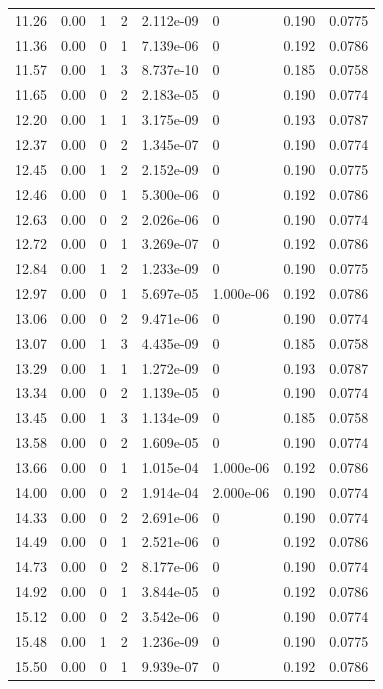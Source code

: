 \documentclass[preview]{standalone}
\begin{document}
{{{\begin{tabular}{L{1.2cm}C{1.2cm} C{0.3cm}C{0.5cm} C{1.4cm}C{1.4cm} C{1.4cm}C{1.4cm}}
  11.26  &  0.00  & 1     &  2 &  2.112e-09  & 0  & 0.190 &  0.0775   \\ 
  11.36  &  0.00  & 0     &  1 &  7.139e-06  & 0  & 0.192 &  0.0786   \\ 
  11.57  &  0.00  & 1     &  3 &  8.737e-10  & 0  & 0.185 &  0.0758   \\ 
  11.65  &  0.00  & 0     &  2 &  2.183e-05  & 0  & 0.190 &  0.0774   \\ 
  12.20  &  0.00  & 1     &  1 &  3.175e-09  & 0  & 0.193 &  0.0787   \\ 
  12.37  &  0.00  & 0     &  2 &  1.345e-07  & 0  & 0.190 &  0.0774   \\ 
  12.45  &  0.00  & 1     &  2 &  2.152e-09  & 0  & 0.190 &  0.0775   \\ 
  12.46  &  0.00  & 0     &  1 &  5.300e-06  & 0  & 0.192 &  0.0786   \\ 
  12.63  &  0.00  & 0     &  2 &  2.026e-06  & 0  & 0.190 &  0.0774   \\ 
  12.72  &  0.00  & 0     &  1 &  3.269e-07  & 0  & 0.192 &  0.0786   \\ 
  12.84  &  0.00  & 1     &  2 &  1.233e-09  & 0  & 0.190 &  0.0775   \\ 
  12.97  &  0.00  & 0     &  1 &  5.697e-05  & 1.000e-06  & 0.192 &  0.0786   \\ 
  13.06  &  0.00  & 0     &  2 &  9.471e-06  & 0  & 0.190 &  0.0774   \\ 
  13.07  &  0.00  & 1     &  3 &  4.435e-09  & 0  & 0.185 &  0.0758   \\ 
  13.29  &  0.00  & 1     &  1 &  1.272e-09  & 0  & 0.193 &  0.0787   \\ 
  13.34  &  0.00  & 0     &  2 &  1.139e-05  & 0  & 0.190 &  0.0774   \\ 
  13.45  &  0.00  & 1     &  3 &  1.134e-09  & 0  & 0.185 &  0.0758   \\ 
  13.58  &  0.00  & 0     &  2 &  1.609e-05  & 0  & 0.190 &  0.0774   \\ 
  13.66  &  0.00  & 0     &  1 &  1.015e-04  & 1.000e-06  & 0.192 &  0.0786   \\ 
  14.00  &  0.00  & 0     &  2 &  1.914e-04  & 2.000e-06  & 0.190 &  0.0774   \\ 
  14.33  &  0.00  & 0     &  2 &  2.691e-06  & 0  & 0.190 &  0.0774   \\ 
  14.49  &  0.00  & 0     &  1 &  2.521e-06  & 0  & 0.192 &  0.0786   \\ 
  14.73  &  0.00  & 0     &  2 &  8.177e-06  & 0  & 0.190 &  0.0774   \\ 
  14.92  &  0.00  & 0     &  1 &  3.844e-05  & 0  & 0.192 &  0.0786   \\ 
  15.12  &  0.00  & 0     &  2 &  3.542e-06  & 0  & 0.190 &  0.0774   \\ 
  15.48  &  0.00  & 1     &  2 &  1.236e-09  & 0  & 0.190 &  0.0775   \\ 
  15.50  &  0.00  & 0     &  1 &  9.939e-07  & 0  & 0.192 &  0.0786   \\ 
\hline 
\end{tabular} 

}}}
\end{document}
